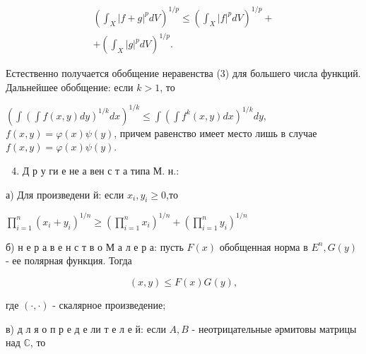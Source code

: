 \documentclass[10pt]{article}
\begin{document}
\[

\begin{gathered}

\left(\int_{X}|f+g|^{p} d V\right)^{1 / p} \leqslant\left(\int_{X}|f|^{p} d V\right)^{1 / p}+ \\

+\left(\int_{X}|g|^{p} d V\right)^{1 / p} .

\end{gathered}

\]



Естественно получается обобщение неравенства (3) для большего числа функций. Дальнейшее обобщение: если $k>1$, то



$\left(\int\left(\int f(x, y) d y\right)^{1 / k} d x\right)^{1 / k} \leqslant \int\left(\int f^{k}(x, y) d x\right)^{1 / k} d y$, $f(x, y)=\varphi(x) \psi(y)$, причем равенство имеет место лишь в случае $f(x, y)=\varphi(x) \psi(y)$.



\begin{enumerate}

  \setcounter{enumi}{3}

  \item Д р у ги е не а вен с т а типа М. н.:

\end{enumerate}



а) Для произведени й: если $x_{i}, y_{i} \geqslant 0$,то



$\prod_{i=1}^{n}\left(x_{i}+y_{i}\right)^{1 / n} \geqslant\left(\prod_{i=1}^{n} x_{i}\right)^{1 / n}+\left(\prod_{i=1}^{n} y_{i}\right)^{1 / n}$



б) н е р а в е н с т в о М а л е р а: пусть $F(x)$ обобщенная норма в $E^{n}, G(y)$ - ее полярная функция. Тогда



\[

(x, y) \leqslant F(x) G(y),

\]



где $(\cdot, \cdot)$ - скалярное произведение;



в) д л я о п р е д е ли т е л е й: если $A, B$ - неотрицательные әрмитовы матрицы над $\mathbb{C}$, то
\end{document}
